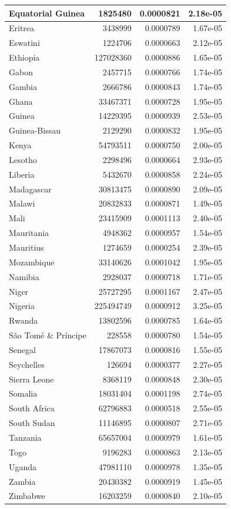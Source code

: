 \documentclass[
]{book}
\begin{document}
\begin{table}
\begin{tabular}[t]{l|r|r|r}
\hline
Equatorial Guinea & 1825480 & 0.0000821 & 2.18e-05\\
\hline
Eritrea & 3438999 & 0.0000789 & 1.67e-05\\
\hline
Eswatini & 1224706 & 0.0000663 & 2.12e-05\\
\hline
Ethiopia & 127028360 & 0.0000886 & 1.65e-05\\
\hline
Gabon & 2457715 & 0.0000766 & 1.74e-05\\
\hline
Gambia & 2666786 & 0.0000843 & 1.74e-05\\
\hline
Ghana & 33467371 & 0.0000728 & 1.95e-05\\
\hline
Guinea & 14229395 & 0.0000939 & 2.53e-05\\
\hline
Guinea-Bissau & 2129290 & 0.0000832 & 1.95e-05\\
\hline
Kenya & 54793511 & 0.0000750 & 2.00e-05\\
\hline
Lesotho & 2298496 & 0.0000664 & 2.93e-05\\
\hline
Liberia & 5432670 & 0.0000858 & 2.24e-05\\
\hline
Madagascar & 30813475 & 0.0000890 & 2.09e-05\\
\hline
Malawi & 20832833 & 0.0000871 & 1.49e-05\\
\hline
Mali & 23415909 & 0.0001113 & 2.40e-05\\
\hline
Mauritania & 4948362 & 0.0000957 & 1.54e-05\\
\hline
Mauritius & 1274659 & 0.0000254 & 2.39e-05\\
\hline
Mozambique & 33140626 & 0.0001042 & 1.95e-05\\
\hline
Namibia & 2928037 & 0.0000718 & 1.71e-05\\
\hline
Niger & 25727295 & 0.0001167 & 2.47e-05\\
\hline
Nigeria & 225494749 & 0.0000912 & 3.25e-05\\
\hline
Rwanda & 13802596 & 0.0000785 & 1.64e-05\\
\hline
São Tomé \& Príncipe & 228558 & 0.0000780 & 1.54e-05\\
\hline
Senegal & 17867073 & 0.0000816 & 1.55e-05\\
\hline
Seychelles & 126694 & 0.0000377 & 2.27e-05\\
\hline
Sierra Leone & 8368119 & 0.0000848 & 2.30e-05\\
\hline
Somalia & 18031404 & 0.0001198 & 2.74e-05\\
\hline
South Africa & 62796883 & 0.0000518 & 2.55e-05\\
\hline
South Sudan & 11146895 & 0.0000807 & 2.71e-05\\
\hline
Tanzania & 65657004 & 0.0000979 & 1.61e-05\\
\hline
Togo & 9196283 & 0.0000863 & 2.13e-05\\
\hline
Uganda & 47981110 & 0.0000978 & 1.35e-05\\
\hline
Zambia & 20430382 & 0.0000919 & 1.45e-05\\
\hline
Zimbabwe & 16203259 & 0.0000840 & 2.10e-05\\
\hline
\end{tabular}
\end{table}
\end{document}
